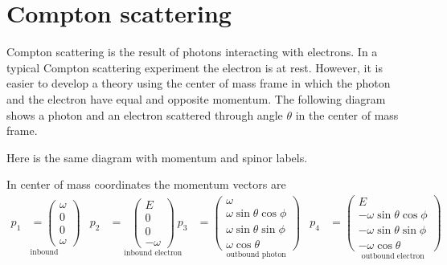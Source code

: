\documentclass[12pt]{article}
\begin{document}
\section*{Compton scattering}
Compton scattering is the result of photons interacting with electrons.
In a typical Compton scattering experiment the electron is at rest.
However, it is easier to develop a theory using the center of mass frame in which
the photon and the electron have equal and opposite momentum.
The following diagram shows a photon and an electron scattered through angle $\theta$
in the center of mass frame.
\begin{center}
\end{center}

Here is the same diagram with momentum and spinor labels.
\begin{center}
\end{center}

In center of mass coordinates the momentum vectors are
\begin{align*}
p_1&
\underset{\text{inbound photon}}
{
=\begin{pmatrix}\omega\\0\\0\\ \omega\end{pmatrix}
}
&
p_2&=
\underset{\text{inbound electron}}
{
\begin{pmatrix}E\\0\\0\\-\omega\end{pmatrix}
}
&
p_3&=
\underset{\text{outbound photon}}
{
\begin{pmatrix}
\omega\\
\omega\sin\theta\cos\phi\\
\omega\sin\theta\sin\phi\\
\omega\cos\theta
\end{pmatrix}
}
&
p_4&=
\underset{\text{outbound electron}}
{
\begin{pmatrix}
E\\
-\omega\sin\theta\cos\phi\\
-\omega\sin\theta\sin\phi\\
-\omega\cos\theta
\end{pmatrix}
}
\end{align*}
\end{document}
